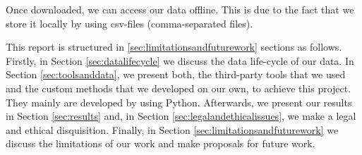 Once downloaded, we can access our data offline. This is due to the fact that we store it locally by using csv-files (comma-separated files).

This report is structured in \ref{sec:limitationsandfuturework} sections as follows. Firstly, in Section \ref{sec:datalifecycle} we discuss the data life-cycle of our data. In Section  \ref{sec:toolsanddata}, we present both, the third-party tools that we used and the custom methods that we developed on	 our own, to achieve this project. They mainly are developed by using Python.  Afterwards, we present our results in Section \ref{sec:results} and, in Section \ref{sec:legalandethicalissues}, we make a legal and ethical disquisition. Finally, in Section \ref{sec:limitationsandfuturework} we discuss the limitations of our work and make proposals for future work.